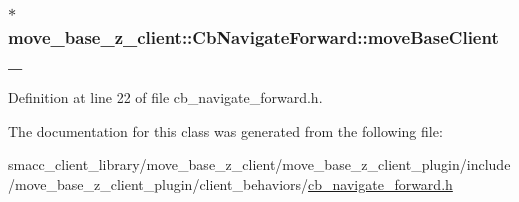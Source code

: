 \subsubsection[{\texorpdfstring{move\+Base\+Client\+\_\+}{moveBaseClient_}}]{$\ast$ move\+\_\+base\+\_\+z\+\_\+client\+::\+Cb\+Navigate\+Forward\+::move\+Base\+Client\+\_\+}\hypertarget{classmove__base__z__client_1_1CbNavigateForward_a20ebd5e221af450360477380995c2933}{}\label{classmove__base__z__client_1_1CbNavigateForward_a20ebd5e221af450360477380995c2933}


Definition at line 22 of file cb\+\_\+navigate\+\_\+forward.\+h.



The documentation for this class was generated from the following file\+:\begin{DoxyCompactItemize}
\item 
smacc\+\_\+client\+\_\+library/move\+\_\+base\+\_\+z\+\_\+client/move\+\_\+base\+\_\+z\+\_\+client\+\_\+plugin/include/move\+\_\+base\+\_\+z\+\_\+client\+\_\+plugin/client\+\_\+behaviors/\hyperlink{smacc__client__library_2move__base__z__client_2move__base__z__client__plugin_2include_2move__bas3f31d4d52bbf09e30133b849422d4b0f}{cb\+\_\+navigate\+\_\+forward.\+h}\end{DoxyCompactItemize}
